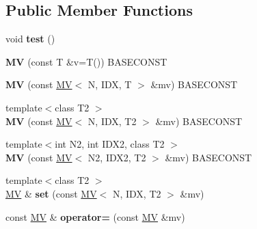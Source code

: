 \subsection*{Public Member Functions}
\begin{DoxyCompactItemize}
\item 
\hypertarget{classvsr_1_1_m_v_acbbea18ba2e838ccc00b3378361fac44}{void {\bfseries test} ()}\label{classvsr_1_1_m_v_acbbea18ba2e838ccc00b3378361fac44}

\item 
\hypertarget{classvsr_1_1_m_v_ac755395f38c106080e9ab3a598d622e4}{{\bfseries M\-V} (const T \&v=T()) B\-A\-S\-E\-C\-O\-N\-S\-T}\label{classvsr_1_1_m_v_ac755395f38c106080e9ab3a598d622e4}

\item 
\hypertarget{classvsr_1_1_m_v_a187a7760ff4ec4e5250f50738beac7ef}{{\bfseries M\-V} (const \hyperlink{classvsr_1_1_m_v}{M\-V}$<$ N, I\-D\-X, T $>$ \&mv) B\-A\-S\-E\-C\-O\-N\-S\-T}\label{classvsr_1_1_m_v_a187a7760ff4ec4e5250f50738beac7ef}

\item 
\hypertarget{classvsr_1_1_m_v_a7fd767a87c693a1f4957a6b94156d35d}{{\footnotesize template$<$class T2 $>$ }\\{\bfseries M\-V} (const \hyperlink{classvsr_1_1_m_v}{M\-V}$<$ N, I\-D\-X, T2 $>$ \&mv) B\-A\-S\-E\-C\-O\-N\-S\-T}\label{classvsr_1_1_m_v_a7fd767a87c693a1f4957a6b94156d35d}

\item 
\hypertarget{classvsr_1_1_m_v_a6176abee7d4909c818b5bd9587d6a83a}{{\footnotesize template$<$int N2, int I\-D\-X2, class T2 $>$ }\\{\bfseries M\-V} (const \hyperlink{classvsr_1_1_m_v}{M\-V}$<$ N2, I\-D\-X2, T2 $>$ \&mv) B\-A\-S\-E\-C\-O\-N\-S\-T}\label{classvsr_1_1_m_v_a6176abee7d4909c818b5bd9587d6a83a}

\item 
\hypertarget{classvsr_1_1_m_v_ab8614b8cd671bd66ef2a1ecc842bb5b3}{{\footnotesize template$<$class T2 $>$ }\\\hyperlink{classvsr_1_1_m_v}{M\-V} \& {\bfseries set} (const \hyperlink{classvsr_1_1_m_v}{M\-V}$<$ N, I\-D\-X, T2 $>$ \&mv)}\label{classvsr_1_1_m_v_ab8614b8cd671bd66ef2a1ecc842bb5b3}

\item 
\hypertarget{classvsr_1_1_m_v_a6d21a355e5f87e66366e87d2e8f73335}{const \hyperlink{classvsr_1_1_m_v}{M\-V} \& {\bfseries operator=} (const \hyperlink{classvsr_1_1_m_v}{M\-V} \&mv)}\label{classvsr_1_1_m_v_a6d21a355e5f87e66366e87d2e8f73335}


\end{DoxyCompactItemize}
